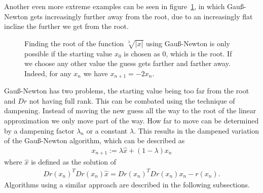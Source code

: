 Another even more extreme examples can be seen in figure~\ref{fig:gauss_newton_fails_cubic_root}, in which Gauß-Newton gets increasingly further away from the root, due to an increasingly flat incline the further we get from the root.

\begin{figure}[h!]
	\centering
	\caption{Finding the root of the function $\sqrt[3]{|x|}$ using Gauß-Newton is only possible if the starting value $x_0$ is chosen as $0$, which is the root. If we choose any other value the guess gets farther and farther away. Indeed, for any $x_n$ we have $x_{n+1} = -2x_n$.}
	\label{fig:gauss_newton_fails_cubic_root}
\end{figure}

Gauß-Newton has two problems, the starting value being too far from the root and $Dr$ not having full rank. This can be combated using the technique of dampening. Instead of moving the new guess all the way to the root of the linear approximation we only move part of the way. How far to move can be determined by a dampening factor $\lambda_n$ or a constant $\lambda$. This results in the dampened variation of the Gauß-Newton algorithm, which can be described as
\begin{align*}
	x_{n+1} := \lambda \hat{x} + (1- \lambda) x_n
\end{align*}
where $\hat{x}$ is defined as the solution of
\begin{align*}
	Dr(x_n)^T Dr(x_n) \hat{x} = Dr(x_n)^T Dr(x_n) x_n - r(x_n).
\end{align*}
Algorithms using a similar approach are described in the following subsections.

